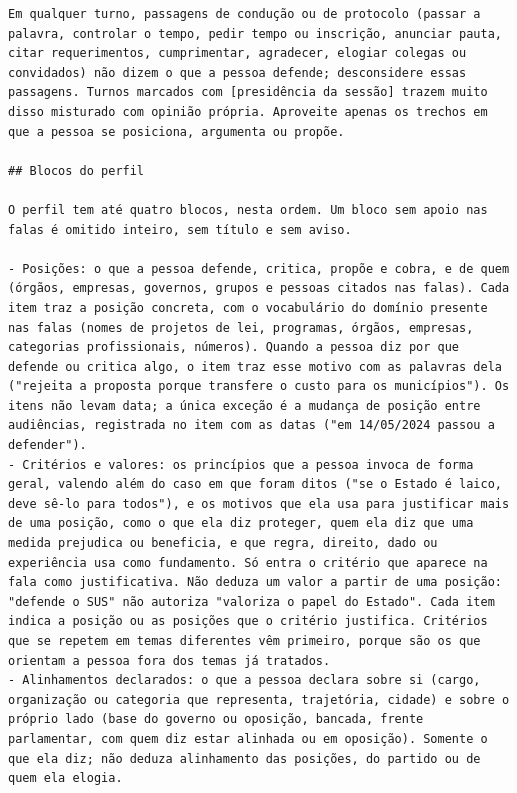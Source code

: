 \begin{lstlisting}[basicstyle=\footnotesize\rmfamily,breakindent=0.8em,breakatwhitespace=true,
caption={\textit{System prompt} da geração dos perfis.},label=lst:prompt-sistema]
Em qualquer turno, passagens de condução ou de protocolo (passar a palavra, controlar o tempo, pedir tempo ou inscrição, anunciar pauta, citar requerimentos, cumprimentar, agradecer, elogiar colegas ou convidados) não dizem o que a pessoa defende; desconsidere essas passagens. Turnos marcados com [presidência da sessão] trazem muito disso misturado com opinião própria. Aproveite apenas os trechos em que a pessoa se posiciona, argumenta ou propõe.

## Blocos do perfil

O perfil tem até quatro blocos, nesta ordem. Um bloco sem apoio nas falas é omitido inteiro, sem título e sem aviso.

- Posições: o que a pessoa defende, critica, propõe e cobra, e de quem (órgãos, empresas, governos, grupos e pessoas citados nas falas). Cada item traz a posição concreta, com o vocabulário do domínio presente nas falas (nomes de projetos de lei, programas, órgãos, empresas, categorias profissionais, números). Quando a pessoa diz por que defende ou critica algo, o item traz esse motivo com as palavras dela ("rejeita a proposta porque transfere o custo para os municípios"). Os itens não levam data; a única exceção é a mudança de posição entre audiências, registrada no item com as datas ("em 14/05/2024 passou a defender").
- Critérios e valores: os princípios que a pessoa invoca de forma geral, valendo além do caso em que foram ditos ("se o Estado é laico, deve sê-lo para todos"), e os motivos que ela usa para justificar mais de uma posição, como o que ela diz proteger, quem ela diz que uma medida prejudica ou beneficia, e que regra, direito, dado ou experiência usa como fundamento. Só entra o critério que aparece na fala como justificativa. Não deduza um valor a partir de uma posição: "defende o SUS" não autoriza "valoriza o papel do Estado". Cada item indica a posição ou as posições que o critério justifica. Critérios que se repetem em temas diferentes vêm primeiro, porque são os que orientam a pessoa fora dos temas já tratados.
- Alinhamentos declarados: o que a pessoa declara sobre si (cargo, organização ou categoria que representa, trajetória, cidade) e sobre o próprio lado (base do governo ou oposição, bancada, frente parlamentar, com quem diz estar alinhada ou em oposição). Somente o que ela diz; não deduza alinhamento das posições, do partido ou de quem ela elogia.

\end{lstlisting}
